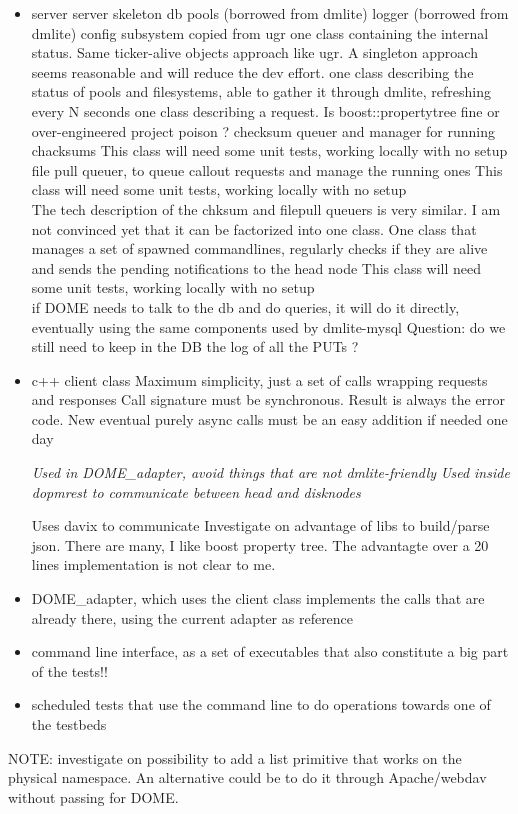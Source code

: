 \documentclass[a4paper,10pt]{scrreprt}
\begin{document}
\begin{itemize}
 \item server
 \subitem server skeleton
 \subitem db pools (borrowed from dmlite)
 \subitem logger (borrowed from dmlite)
 \subitem config subsystem copied from ugr
 \subitem one class containing the internal status. Same ticker-alive objects approach like ugr. A singleton approach seems reasonable and will reduce the dev effort.
 \subsubitem one class describing the status of pools and filesystems, able to gather it through dmlite, refreshing every N seconds
 \subitem one class describing a request. Is boost::propertytree fine or over-engineered project poison ?
 \subitem checksum queuer and manager for running chacksums
  This class will need some unit tests, working locally with no setup\\
  
 \subitem file pull queuer, to queue callout requests and manage the running ones
 This class will need some unit tests, working locally with no setup\\
 
 The tech description of the chksum and filepull queuers is very similar. I am not convinced yet that it can be factorized into one class.
 \subitem One class that manages a set of spawned commandlines, regularly checks if they are alive and sends the pending notifications to the head node
 This class will need some unit tests, working locally with no setup\\
 
 \subitem if DOME needs to talk to the db and do queries, it will do it directly, eventually using the same components used by dmlite-mysql
 \subitem Question: do we still need to keep in the DB the log of all the PUTs ?
 
 \item c++ client class
 \subitem Maximum simplicity, just a set of calls wrapping requests and responses
 \subitem Call signature must be synchronous. Result is always the error code.
 \subitem New eventual purely async calls must be an easy addition if needed one day
 
 \subitem \textit{Used in DOME\_adapter, avoid things that are not dmlite-friendly}
 \subitem \textit{Used inside dopmrest to communicate between head and disknodes}
 
 \subitem Uses davix to communicate
 \subitem Investigate on advantage of libs to build/parse json. There are many, I like boost property tree. The advantagte over a 20 lines implementation is not clear to me.
 
 \item DOME\_adapter, which uses the client class
 \subitem implements the calls that are already there, using the current adapter as reference
 
 \item command line interface, as a set of executables that also constitute a big part of the tests!!

 \item scheduled tests that use the command line to do operations towards one of the testbeds
 
\end{itemize}


NOTE: investigate on possibility to add a list primitive that works on the physical namespace. An alternative could be to do it through Apache/webdav without passing for DOME.
\end{document}
